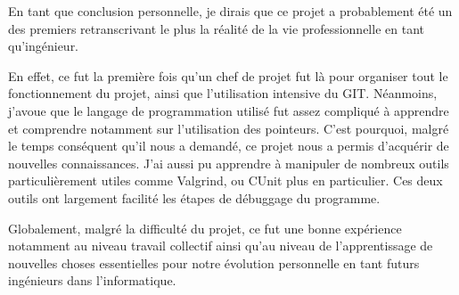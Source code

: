 En tant que conclusion personnelle, je dirais que ce projet a probablement été un des premiers retranscrivant le plus la réalité de la vie professionnelle en tant qu'ingénieur.\par
En effet, ce fut la première fois qu'un chef de projet fut là pour organiser tout le fonctionnement du projet, ainsi que l'utilisation intensive du GIT. Néanmoins, j'avoue que le langage de programmation utilisé fut assez compliqué à apprendre et comprendre notamment sur l'utilisation des pointeurs. C'est pourquoi, malgré le temps conséquent qu'il nous a demandé, ce projet nous a permis d'acquérir de nouvelles connaissances. J'ai aussi pu apprendre à manipuler de nombreux outils particulièrement utiles comme Valgrind, ou CUnit plus en particulier. Ces deux outils ont largement facilité les étapes de débuggage du programme.\par
Globalement, malgré la difficulté du projet, ce fut une bonne expérience notamment au niveau travail collectif ainsi qu'au niveau de l'apprentissage de nouvelles choses essentielles pour notre évolution personnelle en tant futurs ingénieurs dans l'informatique.
